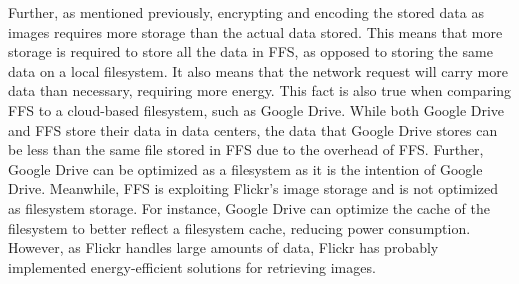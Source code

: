 Further, as mentioned previously, encrypting and encoding the stored data as images requires more storage than the actual data stored. This means that more storage is required to store all the data in FFS, as opposed to storing the same data on a local filesystem. It also means that the network request will carry more data than necessary, requiring more energy. This fact is also true when comparing FFS to a cloud-based filesystem, such as Google Drive. While both Google Drive and FFS store their data in data centers, the data that Google Drive stores can be less than the same file stored in FFS due to the overhead of FFS. Further, Google Drive can be optimized as a filesystem as it is the intention of Google Drive. Meanwhile, FFS is exploiting Flickr's image storage and is not optimized as filesystem storage. For instance, Google Drive can optimize the cache of the filesystem to better reflect a filesystem cache, reducing power consumption. However, as Flickr handles large amounts of data, Flickr has probably implemented energy-efficient solutions for retrieving images. 


